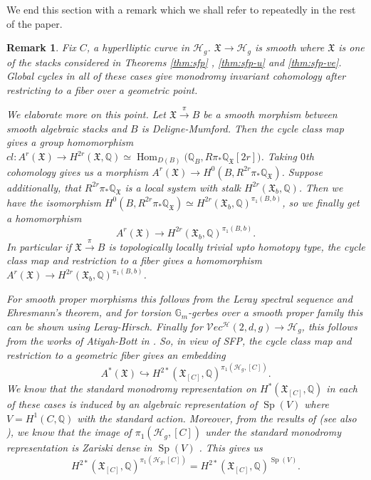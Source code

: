 \documentclass[11pt]{amsart}
\newtheorem{rem}[theorem]{Remark}
\theoremstyle{definition}
\begin{document}
\noindent We end this section with a remark which we shall refer to repeatedly in the rest of the paper.
\begin{rem}\label{monodromy argument}
    Fix $C$, a hyperlliptic curve in $\mathcal H_g$. $\mathfrak X\rightarrow \mathcal H_g$ is smooth where $\mathfrak X$ is one of the stacks considered in Theorems \ref{thm:sfp} , \ref{thm:sfp-u} and \ref{thm:sfp-ve}. Global cycles in all of these cases give monodromy invariant cohomology after restricting to a fiber over a geometric point. 

    \noindent We elaborate more on this point. Let $\mathfrak X \xrightarrow{\pi} B$ be a smooth morphism between smooth algebraic stacks and $B$ is Deligne-Mumford. Then the cycle class map gives a group homomorphism $cl: A^r (\mathfrak X) \rightarrow H^{2r}(\mathfrak X,\mathbb Q) \simeq \operatorname{Hom}_{D(B)} \big ( \mathbb Q_B, R \pi_* \mathbb Q_{\mathfrak X} [2r] \big )$. Taking $0$th cohomology gives us a morphism $A^r (\mathfrak X) \rightarrow H^0(B, R^{2r}\pi_* \mathbb Q_{\mathfrak X})$. Suppose additionally, that $R^{2r}\pi_* \mathbb Q_\mathfrak X$ is a local system with stalk $H^{2r}(\mathfrak X_b, \mathbb Q)$. Then we have the isomorphism $H^0 (B, R^{2r}\pi_* \mathbb Q_\mathfrak X) \simeq H^{2r} (\mathfrak X_b, \mathbb Q)^{\pi_1(B,b)}$, so we finally get a homomorphism \begin{equation*}
        A^{r}(\mathfrak X) \rightarrow H^{2r}(\mathfrak X_b,\mathbb Q )^{\pi_1(B,b)}.
    \end{equation*}  
    In particular if $\mathfrak X\xrightarrow{\pi}B$ is topologically locally trivial upto homotopy type, the cycle class map and restriction to a fiber gives a homomorphism $ A^{r}(\mathfrak X) \rightarrow H^{2r}(\mathfrak X_b,\mathbb Q )^{\pi_1(B,b)}$. 

    
    \noindent For smooth proper morphisms this follows from the Leray spectral sequence and Ehresmann's theorem, and for torsion $\mathbb G_m$-gerbes over a smooth proper family this can be shown using Leray-Hirsch. Finally for $\mathcal Vec^\mathcal H(2,d,g) \rightarrow \mathcal H_g$, this follows from the works of Atiyah-Bott in \cite{atiyah-bott}. So, in view of SFP, the cycle class map and restriction to a geometric fiber gives an embedding $$A^* (\mathfrak X) \hookrightarrow H^{2*} (\mathfrak X_{[C]},\mathbb Q)^{\pi_1(\mathcal H_g, [C])}.$$  We know that the standard monodromy representation on $H^{*}(\mathfrak X_{[C]},\mathbb Q)$ in each of these cases is induced by an algebraic representation of $\operatorname{Sp}(V)$ where $V=H^1(C,\mathbb Q)$ with the standard action. Moreover, from the results of \cite{MR535062} (see also \cite[Theorem 8.1]{MR4182796}), we know that the image of $\pi_1(\mathcal H_g ,[C])$ under the standard monodromy representation is Zariski dense in $\operatorname{Sp}(V)$ . This gives us $$H^{2*} (\mathfrak X_{[C]},\mathbb Q)^{\pi_1(\mathcal H_g, [C])}=H^{2*} (\mathfrak X_{[C]},\mathbb Q)^{\operatorname{Sp}(V)}.$$
\end{rem}
\end{document}
